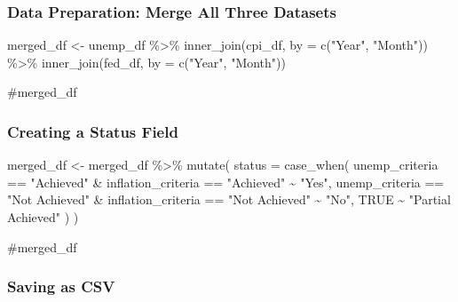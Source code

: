 \documentclass[
  letterpaper,
  DIV=11,
  numbers=noendperiod]{scrartcl}
\newenvironment{Shaded}{\begin{snugshade}}{\end{snugshade}}
\newcommand{\AttributeTok}[1]{\textcolor[rgb]{0.40,0.45,0.13}{#1}}
\newcommand{\CommentTok}[1]{\textcolor[rgb]{0.37,0.37,0.37}{#1}}
\newcommand{\ConstantTok}[1]{\textcolor[rgb]{0.56,0.35,0.01}{#1}}
\newcommand{\FunctionTok}[1]{\textcolor[rgb]{0.28,0.35,0.67}{#1}}
\newcommand{\NormalTok}[1]{\textcolor[rgb]{0.00,0.23,0.31}{#1}}
\newcommand{\OtherTok}[1]{\textcolor[rgb]{0.00,0.23,0.31}{#1}}
\newcommand{\SpecialCharTok}[1]{\textcolor[rgb]{0.37,0.37,0.37}{#1}}
\newcommand{\StringTok}[1]{\textcolor[rgb]{0.13,0.47,0.30}{#1}}
\begin{document}
\subsubsection{Data Preparation: Merge All Three
Datasets}\label{data-preparation-merge-all-three-datasets}

\begin{Shaded}
\begin{Highlighting}[]
\NormalTok{merged\_df }\OtherTok{\textless{}{-}}\NormalTok{ unemp\_df }\SpecialCharTok{\%\textgreater{}\%}
  \FunctionTok{inner\_join}\NormalTok{(cpi\_df, }\AttributeTok{by =} \FunctionTok{c}\NormalTok{(}\StringTok{"Year"}\NormalTok{, }\StringTok{"Month"}\NormalTok{)) }\SpecialCharTok{\%\textgreater{}\%}
  \FunctionTok{inner\_join}\NormalTok{(fed\_df, }\AttributeTok{by =} \FunctionTok{c}\NormalTok{(}\StringTok{"Year"}\NormalTok{, }\StringTok{"Month"}\NormalTok{))}

\CommentTok{\#merged\_df}
\end{Highlighting}
\end{Shaded}

\subsubsection{Creating a Status Field}\label{creating-a-status-field}

\begin{Shaded}
\begin{Highlighting}[]
\NormalTok{merged\_df }\OtherTok{\textless{}{-}}\NormalTok{ merged\_df }\SpecialCharTok{\%\textgreater{}\%}
  \FunctionTok{mutate}\NormalTok{(}
    \AttributeTok{status =} \FunctionTok{case\_when}\NormalTok{(}
\NormalTok{      unemp\_criteria }\SpecialCharTok{==} \StringTok{"Achieved"} \SpecialCharTok{\&}\NormalTok{ inflation\_criteria }\SpecialCharTok{==} \StringTok{"Achieved"} \SpecialCharTok{\textasciitilde{}} \StringTok{"Yes"}\NormalTok{,}
\NormalTok{      unemp\_criteria }\SpecialCharTok{==} \StringTok{"Not Achieved"} \SpecialCharTok{\&}\NormalTok{ inflation\_criteria }\SpecialCharTok{==} \StringTok{"Not Achieved"} \SpecialCharTok{\textasciitilde{}} \StringTok{"No"}\NormalTok{,}
      \ConstantTok{TRUE} \SpecialCharTok{\textasciitilde{}} \StringTok{"Partial Achieved"}
\NormalTok{    )}
\NormalTok{  )}

\CommentTok{\#merged\_df}
\end{Highlighting}
\end{Shaded}

\subsubsection{Saving as CSV}\label{saving-as-csv-4}
\end{document}
